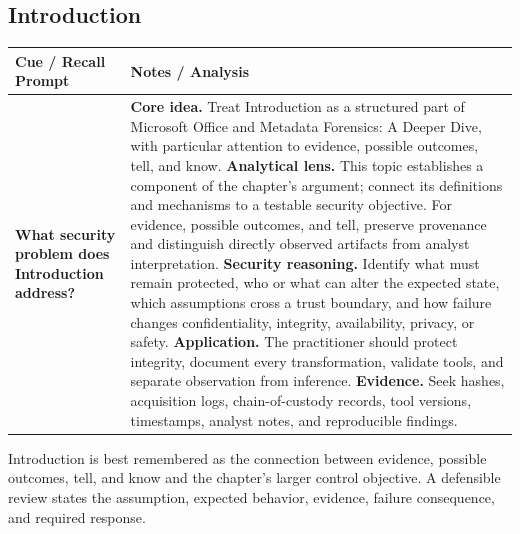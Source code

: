 \documentclass[11pt]{article}
\newcommand{\CornellHeader}{%
\rowcolor{Navy}\color{white}\bfseries Cue / Recall Prompt & \color{white}\bfseries Notes / Analysis\\\hline}
\newcommand{\CornellRow}[2]{%
\cellcolor{CueGray}\RaggedRight\textbf{#1} & \RaggedRight #2\\\hline}
\begin{document}
\subsection*{Introduction}
\begin{longtable}{>{\RaggedRight\arraybackslash}p{}|>{\RaggedRight\arraybackslash}p{}}
\CornellHeader
\CornellRow{What security problem does Introduction address?}{\textbf{Core idea.} Treat Introduction as a structured part of Microsoft Office and Metadata Forensics: A Deeper Dive, with particular attention to evidence, possible outcomes, tell, and know. \textbf{Analytical lens.} This topic establishes a component of the chapter's argument; connect its definitions and mechanisms to a testable security objective. For evidence, possible outcomes, and tell, preserve provenance and distinguish directly observed artifacts from analyst interpretation. \textbf{Security reasoning.} Identify what must remain protected, who or what can alter the expected state, which assumptions cross a trust boundary, and how failure changes confidentiality, integrity, availability, privacy, or safety. \textbf{Application.} The practitioner should protect integrity, document every transformation, validate tools, and separate observation from inference. \textbf{Evidence.} Seek hashes, acquisition logs, chain-of-custody records, tool versions, timestamps, analyst notes, and reproducible findings.}
\end{longtable}
\begin{topicsummary}
Introduction is best remembered as the connection between evidence, possible outcomes, tell, and know and the chapter's larger control objective. A defensible review states the assumption, expected behavior, evidence, failure consequence, and required response.
\end{topicsummary}
\end{document}
